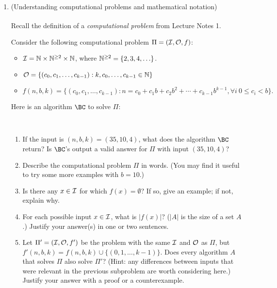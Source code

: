 \documentclass[11pt]{article}
\begin{document}
\begin{enumerate}
\begin{enumerate}
 
    \end{enumerate}
    
    \newpage
    \item (Understanding computational problems and mathematical notation)\\\\
    Recall the definition of a {\em computational problem} from Lecture Notes 1.  \label{prob:BC}

 
    Consider the following computational problem $\Pi=(\mathcal{I},\mathcal{O},f)$: 
    \begin{itemize}                                
    \item $\mathcal{I} = \mathbb{N}\times\mathbb{N}^{\geq 2}\times \mathbb{N}$, where $\mathbb{N}^{\geq 2} = \{2,3,4,\ldots\}$.  
    \item $\mathcal{O} = \{(c_0,c_1,\ldots,c_{k-1}) : k,c_0,\ldots,c_{k-1}\in \mathbb{N}\}$
    \item $f(n,b,k) = \{ (c_0,c_1,\ldots,c_{k-1}) : n=c_0+c_1b+c_2b^2+\cdots+c_{k-1}b^{k-1}, \forall i\ 0\leq c_i< b\}.$ 
    \end{itemize}
Here is an algorithm $\BC$ to solve $\Pi$: 
    
\begin{algorithm}[H]
    \\
    {
    \lElse{\Return{$\bot$}}}
\end{algorithm}


\begin{enumerate}
\item If the input is $(n,b,k) = (35,10,4)$, what does the algorithm $\BC$ return? 
Is $\BC$'s output a valid answer for $\Pi$ with input $(35,10,4)$?
\item Describe the computational problem $\Pi$ in words.  (You may find it useful to try some more examples with $b=10$.) 
\item Is there any $x\in \mathcal{I}$ for which $f(x)=\emptyset$? If so, give an example; if not, explain why.
\item For each possible input $x\in \mathcal{I}$, what is $|f(x)|$? ($|A|$ is the size of a set $A$.) Justify your answer(s) in one or two sentences.
\item Let $\Pi'=(\mathcal{I},\mathcal{O},f')$ be the problem with the same $\mathcal{I}$ and $\mathcal{O}$ as $\Pi$, but $f'(n,b,k) = f(n,b,k) \cup \{(0,1, \ldots,k-1)\}$. Does every algorithm $A$ that solves $\Pi$ also solve $\Pi'$? (Hint: any differences between inputs that were relevant in the previous subproblem are worth considering here.) Justify your answer with a proof or a counterexample.


\end{enumerate}
\end{enumerate}
\end{document}
